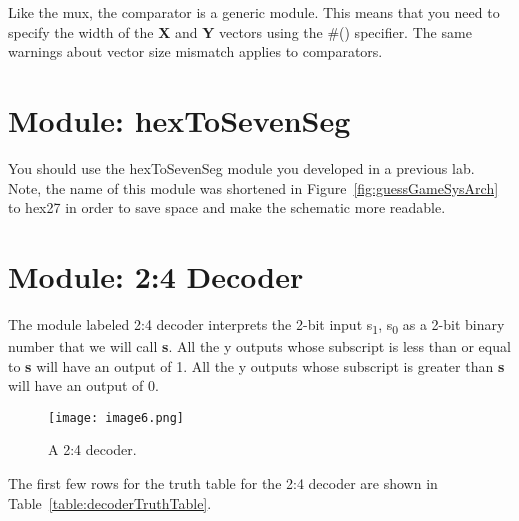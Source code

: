 Like the mux, the comparator is a generic module. This means that you
need to specify the width of the \textbf{X} and \textbf{Y} vectors
using the \#() specifier. The same warnings about vector size mismatch
applies to comparators.

\section{Module: hexToSevenSeg}
You should use the hexToSevenSeg module you developed in a
previous lab. Note, the name of this module was shortened in Figure~\ref{fig:guessGameSysArch}
to hex27 in order to save space and make the schematic more
readable.

\section{Module: 2:4 Decoder}

The module labeled 2:4 decoder interprets the 2-bit input
s\textsubscript{1}, s\textsubscript{0} as a 2-bit binary number that we
will call \textbf{s}. All the y outputs whose subscript is less than or
equal to \textbf{s} will have an output of 1. All the y outputs whose
subscript is greater than \textbf{s} will have an output of 0.

\begin{figure}[ht]
    \texttt{[image: image6.png]}
    \caption{A 2:4 decoder.}
    \label{fig:2x4decoderSymbol}
\end{figure}

The first few rows for the truth table for the 2:4 decoder are shown in
Table~\ref{table:decoderTruthTable}.

